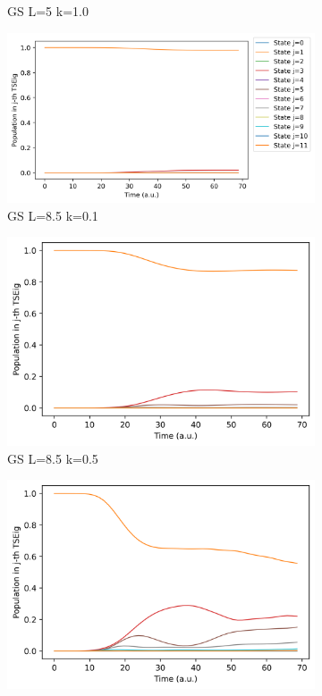 \documentclass[11pt, a4paper]{article} %
\begin{document}
\begin{figure}[h!]
\begin{subfigure}[b]{0.30\linewidth}
    \caption{GS L=5 k=1.0}
  \end{subfigure}
  \begin{subfigure}[b]{0.36\linewidth}
    \includegraphics[width=\linewidth]{Population_GS_L8.5_k0_0.1.png}
    \caption{GS L=8.5 k=0.1}
  \end{subfigure}
    \begin{subfigure}[b]{0.30\linewidth}
    \includegraphics[width=\linewidth]{Population_GS_L8.5_k0_0.5.png}
    \caption{GS L=8.5 k=0.5}
  \end{subfigure}  
  \begin{subfigure}[b]{0.30\linewidth}
    \includegraphics[width=\linewidth]{Population_GS_L8.5_k0_1.0.png}

\end{subfigure}
\end{figure}
\end{document}
